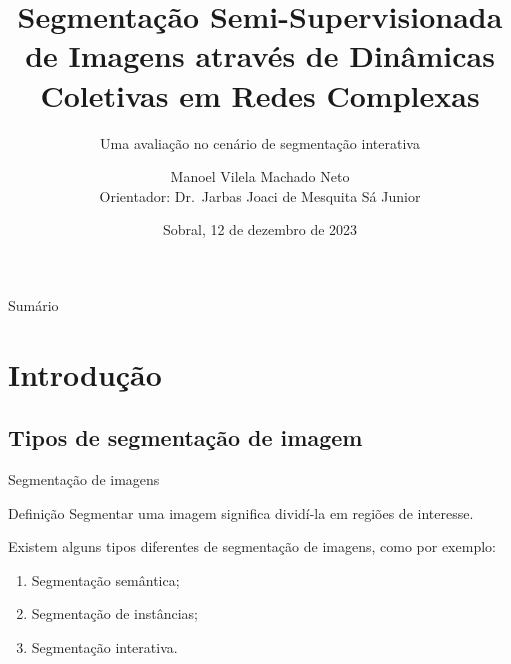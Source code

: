 \documentclass{templatebeamerufc/libs/ufc_format}
\title[EGSIS]{\textbf{Segmentação Semi-Supervisionada de Imagens através de
Dinâmicas Coletivas em Redes Complexas}}
\subtitle{Uma avaliação no cenário de segmentação interativa}
\author[Manoel Vilela Machado Neto]{
  Manoel Vilela Machado Neto \\
  Orientador: Dr.\ Jarbas Joaci de Mesquita Sá Junior
}
\institute[UFC]{
    \normalsize{\email{manoel.machado@alu.ufc.br}}
    \newline
    \department{Engenharia da Computação}
    \newline
    \ufc{}
}
\date{Sobral, 12 de dezembro de 2023}
\begin{document}

\begin{frame}{}
    \maketitle
\end{frame}

\begin{frame}[allowframebreaks]{Sumário}
  \tableofcontents[sections={1---2}]  %
    \framebreak{}
  \tableofcontents[sections={3---5}]  %
\end{frame}

\section{Introdução}

\subsection{Tipos de segmentação de imagem}

\begin{frame}{Segmentação de imagens}
  \begin{block}{Definição}
    Segmentar uma imagem significa dividí-la em regiões de interesse.
  \end{block}

  Existem alguns tipos diferentes de segmentação de imagens, como por
exemplo:
  \begin{enumerate}
    \item Segmentação semântica;
    \item Segmentação de instâncias;
    \item Segmentação interativa.
  \end{enumerate}
\end{frame}
\end{document}
